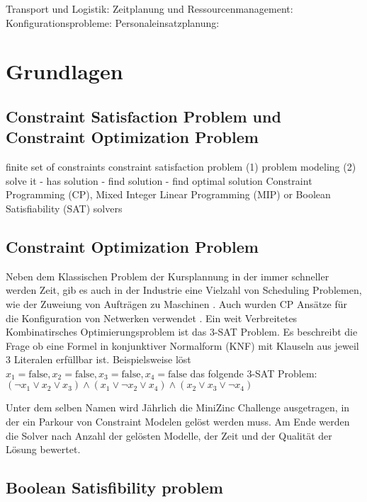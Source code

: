 Transport und Logistik: Zeitplanung und Ressourcenmanagement:
Konfigurationsprobleme: Personaleinsatzplanung:

\cite[1-5]{rossi06bo}

\section{Grundlagen}
\subsection{Constraint Satisfaction Problem und Constraint Optimization Problem} 
\label{sec:Constraint Satisfaction Problem und Constraint Optimization Problem}

finite set of constraints \cite[1]{aptjo} constraint satisfaction problem
\cite[1]{aptjo} (1) problem modeling (2) solve it - has solution - find solution
- find optimal solution
\cite*[postnote]{aptjo}
Constraint Programming (CP), Mixed Integer Linear Programming (MIP) or Boolean
Satisfiability (SAT) solvers



\subsection{Constraint Optimization Problem}
\label{sec: Constraint Optimization Problem}

Neben dem Klassischen Problem der Kursplannung \cite{duboi96jo} in der immer
schneller werden Zeit, gib es auch in der Industrie eine Vielzahl von Scheduling
Problemen, wie der Zuweiung von Aufträgen zu Maschinen \cite{gedik16jo}. Auch
wurden CP Ansätze für die Konfiguration von Netwerken verwendet \cite{ardisjo}.
Ein weit Verbreitetes Kombinatirsches Optimierungsproblem ist das 3-SAT Problem.
Es beschreibt die Frage ob eine Formel in konjunktiver Normalform (KNF) mit
Klauseln aus jeweil 3 Literalen erfüllbar ist.  
Beispielsweise löst 
$x_1=\mathrm{false},x_2=\mathrm{false},x_3=\mathrm{false},x_4=\mathrm{false}$
das folgende 3-SAT Problem: 
$(\lnot x_1\lor x_2\lor x_3)\land(x_1\lor\lnot x_2\lor x_4)\land(x_2\lor x_3\lor\lnot x_4)$

Unter dem selben Namen wird Jährlich die MiniZinc Challenge ausgetragen, in der
ein Parkour von Constraint Modelen gelöst werden muss. Am Ende werden die Solver
nach Anzahl der gelösten Modelle, der Zeit und der Qualität der Lösung bewertet.

\subsection{Boolean Satisfibility problem}
\label{sec: Boolean Satisfibility problem}


